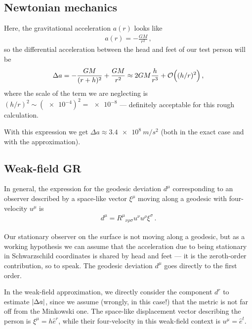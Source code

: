 \documentclass[main.tex]{subfiles}
\begin{document}
\subsection{Newtonian mechanics}

Here, the gravitational acceleration \(a (r)\) looks like 
%
\begin{align}
a (r) = - \frac{GM}{r^2}
\,,
\end{align}
%
so the differential acceleration between the head and feet of our test person will be 
%
\begin{align}
\Delta a = - \frac{GM}{(r + h)^2} + \frac{GM}{r^2} \approx 2GM \frac{h}{r^3} + \order{ (h / r)^2}
\,,
\end{align}
%
where the scale of the term we are neglecting is \((h / r)^2 \sim (\num{e-4})^2 = \num{e-8}\) --- definitely acceptable for this rough calculation.

With this expression we get \(\Delta a \approx \SI{3.4e8}{m/s^2}\) (both in the exact case and with the approximation). 

\subsection{Weak-field GR}

In general, the expression for the geodesic deviation \(d^{\mu }\) corresponding to an observer described by a space-like vector \(\xi^{\mu }\) moving along a geodesic with four-velocity \(u^{\mu }\)  is \cite[eq.\ 3.208]{carrollSpacetimeGeometryIntroduction2019}
%
\begin{align}
d^{\mu } = R^{\mu }{}_{\nu \rho \sigma  } u^{\nu } u^{\rho } \xi^{\sigma }
\,.
\end{align}

Our stationary observer on the surface is not moving along a geodesic, but as a working hypothesis we can assume that
the acceleration due to being stationary in Schwarzschild coordinates is shared by head and feet --- it is the zeroth-order contribution, so to speak. 
The geodesic deviation \(d^{\mu }\) goes directly to the first order. 

In the weak-field approximation, we directly consider the component \(d^{r}\) to estimate \(\abs{\Delta a}\), since we assume (wrongly, in this case!) that the metric is not far off from the Minkowski one.
The space-like displacement vector describing the person is \(\xi^{\mu } = h \hat{e}^{r}\), while their four-velocity in this weak-field context is \(u^{\mu } = \hat{e}^{t}\). 
\end{document}
